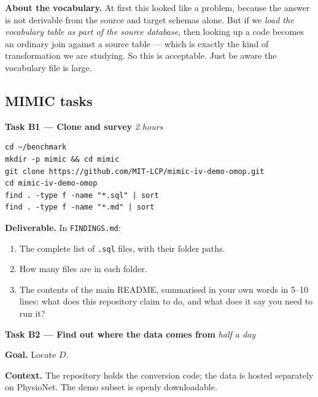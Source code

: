 \documentclass[11pt,a4paper]{article}
\newcommand{\code}[1]{\texttt{\small #1}}
\begin{document}
\begin{notebox}
\textbf{About the vocabulary.} At first this looked like a problem, because the answer is
not derivable from the source and target schemas alone. But if we \emph{load the vocabulary
table as part of the source database}, then looking up a code becomes an ordinary join
against a source table --- which is exactly the kind of transformation we are studying. So
this is acceptable. Just be aware the vocabulary file is large.
\end{notebox}

\subsection{MIMIC tasks}

\begin{taskbox}
\textbf{Task B1 --- Clone and survey} \hfill \emph{2 hours}
\end{taskbox}

\begin{lstlisting}[style=sh]
cd ~/benchmark
mkdir -p mimic && cd mimic
git clone https://github.com/MIT-LCP/mimic-iv-demo-omop.git
cd mimic-iv-demo-omop
find . -type f -name "*.sql" | sort
find . -type f -name "*.md" | sort
\end{lstlisting}

\textbf{Deliverable.} In \code{FINDINGS.md}:

\begin{enumerate}
\item The complete list of \code{.sql} files, with their folder paths.
\item How many files are in each folder.
\item The contents of the main README, summarised in your own words in 5--10 lines:
  what does this repository claim to do, and what does it say you need to run it?
\end{enumerate}

\vspace{4pt}
\begin{taskbox}
\textbf{Task B2 --- Find out where the data comes from} \hfill \emph{half a day}
\end{taskbox}

\textbf{Goal.} Locate $D$.

\textbf{Context.} The repository holds the conversion code; the data is hosted separately
on PhysioNet. The demo subset is openly downloadable.
\end{document}
